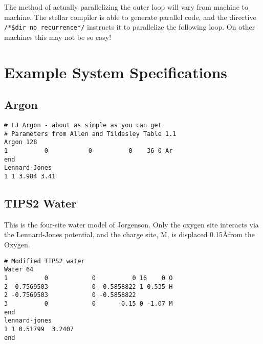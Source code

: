 The method of actually parallelizing the outer loop will vary from
machine to machine. The stellar compiler is able to generate parallel
code, and the directive \verb'/*$dir'~\verb'no_recurrence*/' instructs
it to parallelize the following loop.  On other machines this may not
be so easy!
\appendix
\chapter{Example System Specifications}  %
\label{sec:examples}
\section{Argon}%
\begin{verbatim}
# LJ Argon - about as simple as you can get
# Parameters from Allen and Tildesley Table 1.1
Argon 128
1          0           0          0    36 0 Ar
end
Lennard-Jones
1 1 3.984 3.41
\end{verbatim}
\section{TIPS2 Water}%
This is the four-site water model of Jorgenson\cite{jorgensen:82}.  
Only the oxygen site interacts via the Lennard-Jones
potential, and the charge site, M, is displaced 0.15\AA from the Oxygen.
\begin{verbatim}
# Modified TIPS2 water
Water 64
1          0            0          0 16    0 O
2  0.7569503            0 -0.5858822 1 0.535 H
2 -0.7569503            0 -0.5858822
3          0            0      -0.15 0 -1.07 M
end
lennard-jones
1 1 0.51799  3.2407
end
\end{verbatim}
